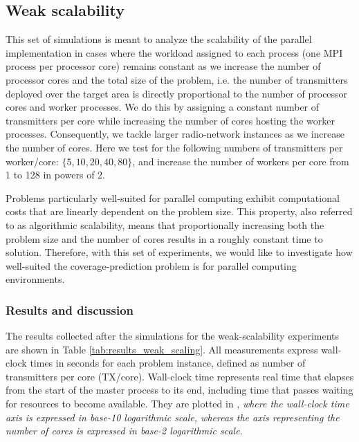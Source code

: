 \subsection{Weak scalability}

This set of simulations is meant to analyze the scalability of the
parallel implementation in cases where the workload assigned to each
process (one MPI process per processor core) remains constant as we
increase the number of processor cores and the total size of the problem,
i.e. the number of transmitters deployed over the target area is directly
proportional to the number of processor cores and worker processes.
We do this by assigning a constant number of transmitters per core
while increasing the number of cores hosting the worker processes.
Consequently, we tackle larger radio-network instances as we increase
the number of cores. Here we test for the following numbers of transmitters
per worker/core: $\{5,10,20,40,80\}$, and increase the number of
workers per core from 1 to 128 in powers of 2.

Problems particularly well-suited for parallel computing exhibit computational
costs that are linearly dependent on the problem size. This property,
also referred to as algorithmic scalability, means that proportionally
increasing both the problem size and the number of cores results in
a roughly constant time to solution. Therefore, with this set of experiments,
we would like to investigate how well-suited the coverage-prediction
problem is for parallel computing environments.


\subsubsection{Results and discussion}

The results collected after the simulations for the weak-scalability
experiments are shown in Table \ref{tab:results_weak_scaling}. All
measurements express wall-clock times in seconds for each problem
instance, defined as number of transmitters per core (TX/core). Wall-clock
time represents real time that elapses from the start of the master
process to its end, including time that passes waiting for resources
to become available. They are plotted in ,
\textit{\emph{where the wall-clock time axis is expressed in base-10
logarithmic scale, whereas the axis representing the number of cores
is expressed in base-2 logarithmic scale.}}

